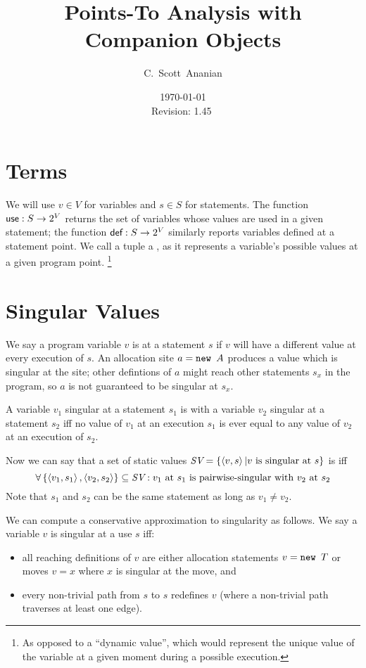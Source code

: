 \documentclass[11pt,notitlepage]{article}
\author{C.~Scott~Ananian}
\title{Points-To Analysis with Companion Objects}
\date{\today \\ $ $Revision: 1.45 $ $}
\newcommand{\bigvar}[1]{\ensuremath{\text{\it #1}}}
\newcommand{\func}[1]{\ensuremath{\text{\sffamily #1}}}
\begin{document}

\maketitle
\section{Terms} %
We will use $v\in V$ for variables and $s\in S$ for statements.  The
function $\func{use}:S\to 2^V$ returns the set of variables whose
values are used in a given statement; the function $\func{def}:S\to
2^V$ similarly reports variables defined at a statement point.
We call a tuple  a , as it represents
a variable's possible values at a given program point.%
\footnote{As opposed to a ``dynamic value'', which would represent the
  unique value of the variable at a given moment during a possible execution.}

\section{Singular Values}

We say a program variable $v$ is  at a statement $s$
if $v$ will have a different value at every execution of $s$.  An
allocation site $a = \text{\tt new }A$ produces a value which is singular
at the site; other defintions of $a$ might reach other statements
$s_x$ in the program, so $a$ is not guaranteed to be singular at $s_x$.

A variable $v_1$ singular at a statement $s_1$ is
 with a variable $v_2$ singular at a statement
$s_2$ iff no value of $v_1$ at an execution $s_1$ is ever equal to any
value of $v_2$ at an execution of $s_2$.

Now we can say that a set of static values
$\bigvar{SV}=\left\{ \tuple{v,s} | v \text{ is singular at } s \right\}$
is
 iff
\begin{displaymath}
\forall \left\{ \tuple{v_1,s_1}, \tuple{v_2,s_2} \right\} \subseteq
        \bigvar{SV} :
v_1 \text{ at } s_1 \text{ is pairwise-singular with } v_2 \text{ at } s_2
\end{displaymath}
Note that $s_1$ and $s_2$ can be the same statement as long as $v_1\neq v_2$.

We can compute a conservative approximation to singularity as follows.
We say a variable $v$ is singular at a use $s$ iff:
\begin{itemize}
\item all reaching definitions of $v$ are either allocation statements 
$v = \text{\tt new }T$ or moves $v = x$ where $x$ is singular at
the move, and
\item every non-trivial path from $s$ to $s$ redefines $v$ (where a
  non-trivial path traverses at least one edge).
\end{itemize}
\end{document}
